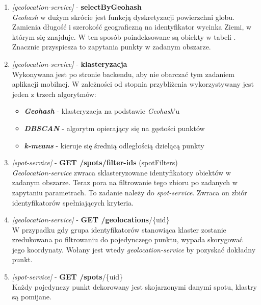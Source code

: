 \begin{enumerate}
    \item
    \Large\emph{[geolocation-service]} - \textbf{selectByGeohash}\normalsize\\
    \emph{Geohash} w dużym skrócie jest funkcją dyskretyzacji powierzchni globu.
    Zamienia długość i szerokość geograficzną na identyfikator wycinka Ziemi, w którym się znajduje.
    W ten sposób poindeksowane są obiekty w tabeli . Znacznie przyspiesza to zapytania punkty w zadanym obszarze.

    \item
    \Large\emph{[geolocation-service]} - \textbf{klasteryzacja}\normalsize\\
    Wykonywana jest po stronie backendu, aby nie obarczać tym zadaniem aplikacji mobilnej. 
    W zależności od stopnia przybliżenia wykorzystywany jest jeden z trzech algorytmów:

    \begin{itemize}
        \item
        \textbf{\emph{Geohash}} - klasteryzacja na podstawie \emph{Geohash}'u

        \item
        \textbf{\emph{DBSCAN}} - algorytm opierający się na gęstości punktów

        \item
        \textbf{\emph{k-means}} - kieruje się średnią odległością dzielącą punkty

    \end{itemize} 
    

    \item
    \Large{\emph{[spot-service]} - \textbf{GET /spots/filter-ids} (spotFilters)}\normalsize\\
    \emph{Geolocation-service} zwraca sklasteryzowane identyfikatory obiektów w zadanym obszarze.
    Teraz pora na filtrowanie tego zbioru po zadanych w zapytaniu parametrach.
    To zadanie należy do \emph{spot-service}. Zwraca on zbiór identyfikatorów spełniających kryteria.

    \item
    \Large{\emph{[geolocation-service]} - \textbf{GET /geolocations}/\{uid\}}\normalsize\\
    W przypadku gdy grupa identyfikatorów stanowiąca klaster zostanie zredukowana po filtrowaniu do pojedynczego punktu, wypada skorygować jego koordynaty.
    Wołany jest wtedy \emph{geolocation-service} by pozyskać dokładny punkt.

    \item
    \Large{\emph{[spot-service]} - \textbf{GET /spots}/\{uid\}}\normalsize\\
    Każdy pojedynczy punkt dekorowany jest skojarzonymi danymi spotu, klastry są pomijane.


\end{enumerate}
